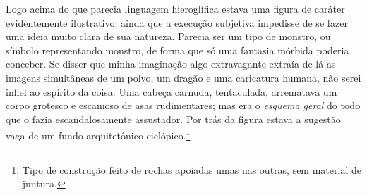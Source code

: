 Logo acima do que parecia linguagem hieroglífica estava uma figura de
caráter evidentemente ilustrativo, ainda que a execução subjetiva
impedisse de se fazer uma ideia muito clara de sua natureza. Parecia ser
um tipo de monstro, ou símbolo representando monstro, de forma que só
uma fantasia mórbida poderia conceber. Se disser que minha imaginação
algo extravagante extraía de lá as imagens simultâneas de um polvo, um
dragão e uma caricatura humana, não serei infiel ao espírito da coisa.
Uma cabeça carnuda, tentaculada, arrematava um corpo grotesco e escamoso
de asas rudimentares; mas era o \emph{esquema geral} do todo que o fazia
escandalosamente assustador. Por trás da figura estava a sugestão vaga
de um fundo arquitetônico ciclópico.\footnote{Tipo de construção feito de
  rochas apoiadas umas nas outras, sem material de juntura.}

